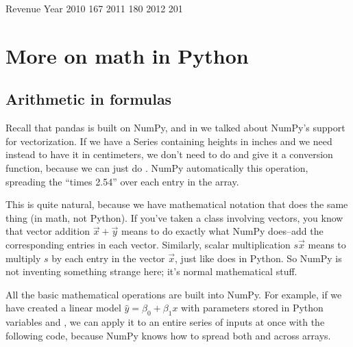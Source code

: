 \documentclass[letterpaper,10pt,english]{sphinxmanual}
\begin{document}
\begin{sphinxVerbatim}[commandchars=\\\{\}]
      Revenue
Year         
2010      167
2011      180
2012      201
\end{sphinxVerbatim}


\section{More on math in Python}
\label{\detokenize{chapter-11-processing-rows:more-on-math-in-python}}

\subsection{Arithmetic in formulas}
\label{\detokenize{chapter-11-processing-rows:arithmetic-in-formulas}}
Recall that pandas is built on NumPy, and in {\hyperref[\detokenize{chapter-9-math-and-stats::doc}]{}} we talked about NumPy’s support for vectorization.  If we have a Series  containing heights in inches and we need instead to have it in centimeters, we don’t need to do  and give it a conversion function, because we can just do .  NumPy automatically  this operation, spreading the “times 2.54” over each entry in the  array.

This is quite natural, because we have mathematical notation that does the same thing (in math, not Python).  If you’ve taken a class involving vectors, you know that vector addition \(\vec x+\vec y\) means to do exactly what NumPy does–add the corresponding entries in each vector.  Similarly, scalar multiplication \(s\vec x\) means to multiply \(s\) by each entry in the vector \(\vec x\), just like  does in Python.  So NumPy is not inventing something strange here; it’s normal mathematical stuff.

All the basic mathematical operations are built into NumPy.  For example, if we have created a linear model \(\hat y=\beta_0+\beta_1 x\) with parameters stored in Python variables  and , we can apply it to an entire series of inputs  at once with the following code, because NumPy knows how to spread both \sphinxcode{\sphinxupquote{+}} and \sphinxcode{\sphinxupquote{*}} across arrays.
\end{document}
